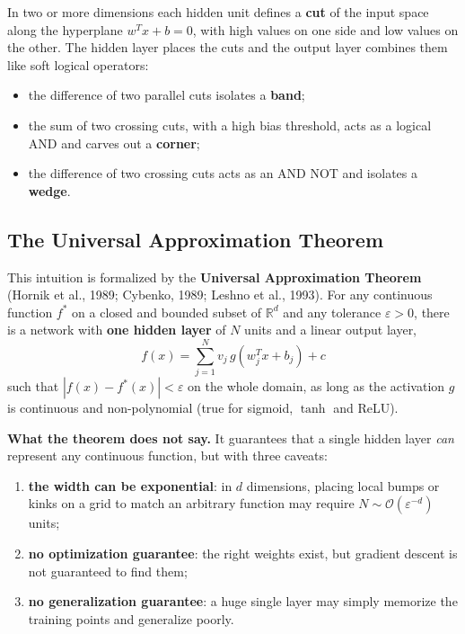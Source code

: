 In two or more dimensions each hidden unit defines a \textbf{cut} of the input
space along the hyperplane $w^T x + b = 0$, with high values on one side and low
values on the other. The hidden layer places the cuts and the output layer combines
them like soft logical operators:
\begin{itemize}
    \item the difference of two parallel cuts isolates a \textbf{band};
    \item the sum of two crossing cuts, with a high bias threshold, acts as a
          logical AND and carves out a \textbf{corner};
    \item the difference of two crossing cuts acts as an AND NOT and isolates a
          \textbf{wedge}.
\end{itemize}

\subsection{The Universal Approximation Theorem}
This intuition is formalized by the \textbf{Universal Approximation Theorem}
(Hornik et al., 1989; Cybenko, 1989; Leshno et al., 1993). For any continuous
function $f^*$ on a closed and bounded subset of $\mathbb{R}^d$ and any tolerance
$\varepsilon > 0$, there is a network with \textbf{one hidden layer} of $N$ units
and a linear output layer,
\begin{equation}
    f(x) = \sum_{j=1}^N v_j \, g\left(w_j^T x + b_j\right) + c
\end{equation}
such that $|f(x) - f^*(x)| < \varepsilon$ on the whole domain, as long as the
activation $g$ is continuous and non-polynomial (true for sigmoid, $\tanh$ and
ReLU).

\begin{note}
    \textbf{What the theorem does not say.} It guarantees that a single hidden layer
    \emph{can} represent any continuous function, but with three caveats:
    \begin{enumerate}
        \item \textbf{the width can be exponential}: in $d$ dimensions, placing local
              bumps or kinks on a grid to match an arbitrary function may require
              $N \sim \mathcal{O}(\varepsilon^{-d})$ units;
        \item \textbf{no optimization guarantee}: the right weights exist, but
              gradient descent is not guaranteed to find them;
        \item \textbf{no generalization guarantee}: a huge single layer may simply
              memorize the training points and generalize poorly.
    \end{enumerate}
\end{note}

